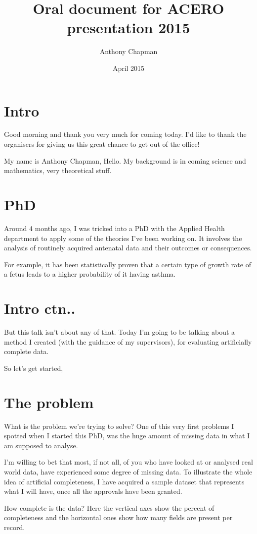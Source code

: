 \documentclass{report}
\title{Oral document for ACERO presentation 2015}
\author{Anthony Chapman}
\date{April 2015}
\begin{document}
\maketitle 

\section*{Intro}
Good morning and thank you very much for coming today. I'd like to thank the organisers for giving us this great chance to get out of the office! 

My name is Anthony Chapman, Hello. My background is in coming science and mathematics, very theoretical stuff. 

\section*{PhD}
Around 4 months ago, I was tricked into a PhD with the Applied Health department to apply some of the theories I've been working on. It involves the analysis of routinely acquired antenatal data and their outcomes or consequences. 

For example, it has been statistically proven that a certain type of growth rate of a fetus leads to a higher probability of it having asthma. 

\section*{Intro ctn..}
But this talk isn't about any of that. Today I'm going to be talking about a method I created (with the guidance of my supervisors), for evaluating artificially complete data. 

So let's get started,

\section*{The problem}
What is the problem we're trying to solve? One of this very first problems I spotted when I started this PhD, was the huge amount of missing data in what I am supposed to analyse. 

I'm willing to bet that most, if not all, of you who have looked at or analysed real world data, have experienced some degree of missing data. To illustrate the whole idea of artificial completeness, I have acquired a sample dataset that represents what I will have, once all the approvals have been granted. 

How complete is the data? Here the vertical axes show the percent of completeness and the horizontal ones show how many fields are present per record. 
\end{document}
